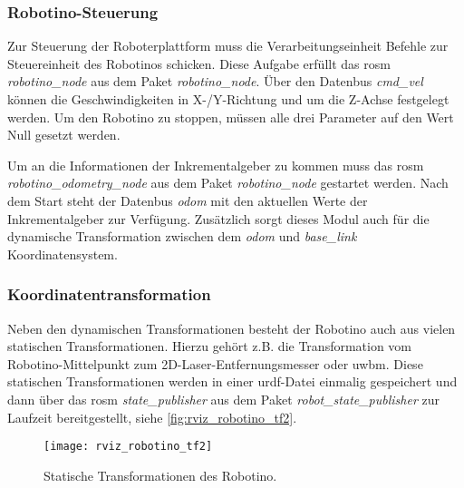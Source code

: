 \subsubsection{Robotino-Steuerung}

Zur Steuerung der Roboterplattform muss die Verarbeitungseinheit Befehle zur Steuereinheit des Robotinos schicken. Diese Aufgabe erfüllt das \Gls{rosm} \textit{robotino\_node} aus dem Paket \textit{robotino\_node}. Über den Datenbus \textit{cmd\_vel} können die Geschwindigkeiten in X-/Y-Richtung und um die Z-Achse festgelegt werden. Um den Robotino zu stoppen, müssen alle drei Parameter auf den Wert Null gesetzt werden.

Um an die Informationen der Inkrementalgeber zu kommen muss das \Gls{rosm} \textit{robotino\_odometry\_node} aus dem Paket \textit{robotino\_node} gestartet werden. Nach dem Start steht der Datenbus \textit{odom} mit den aktuellen Werte der Inkrementalgeber zur Verfügung. Zusätzlich sorgt dieses Modul auch für die dynamische Transformation zwischen dem \textit{odom} und \textit{base\_link} Koordinatensystem.


\begin{comment}
--------------------------------------------------------------------------------
- \url{http://wiki.ros.org/robot_state_publisher}
- \url{http://wiki.ros.org/urdf}
\end{comment}
\subsubsection{Koordinatentransformation}

Neben den dynamischen Transformationen besteht der Robotino auch aus vielen statischen Transformationen. Hierzu gehört z.B. die Transformation vom Robotino-Mittelpunkt zum 2D-Laser-Entfernungsmesser oder \Gls{uwbm}. Diese statischen Transformationen werden in einer \Gls{urdf}-Datei einmalig gespeichert und dann über das \Gls{rosm} \textit{state\_publisher} aus dem Paket \textit{robot\_state\_publisher} zur Laufzeit bereitgestellt, siehe \autoref{fig:rviz_robotino_tf2}.

\begin{figure}[h]
	\centering
	\texttt{[image: rviz\_robotino\_tf2]}
	\caption{Statische Transformationen des Robotino.}
	\label{fig:rviz_robotino_tf2}
\end{figure}


\begin{comment}
--------------------------------------------------------------------------------
- \url{http://wiki.ros.org/joy}
- todo: Referenz auf das lst:joy_node stehen lassen?
\end{comment}
